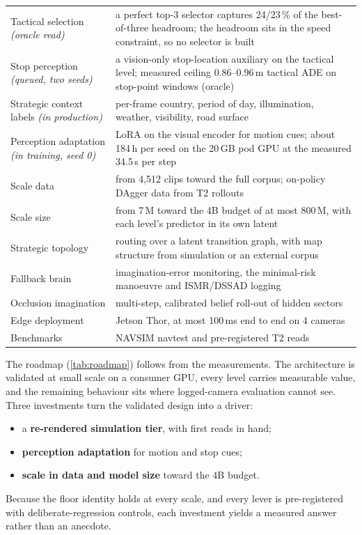 \documentclass[10pt,twocolumn]{article}
\theoremstyle{remark}
\begin{document}
\begin{table}[!t]
\begin{tabularx}{\columnwidth}{@{}>{\raggedright\arraybackslash}p{24mm}>{\raggedright\arraybackslash}X@{}}
Tactical selection \textit{(oracle read)} & a perfect top-3 selector captures 24/23\,\% of the best-of-three headroom; the headroom sits in the speed constraint, so no selector is built \\
Stop perception \textit{(queued, two seeds)} & a vision-only stop-location auxiliary on the tactical level; measured ceiling 0.86--0.96\,m tactical ADE on stop-point windows (oracle) \\
Strategic context labels \textit{(in production)} & per-frame country, period of day, illumination, weather, visibility, road surface \\
Perception adaptation \textit{(in training, seed 0)} & LoRA on the visual encoder for motion cues; about 184\,h per seed on the 20\,GB pod GPU at the measured 34.5\,s per step \\
Scale data & from 4,512 clips toward the full corpus; on-policy DAgger data from T2 rollouts \\
Scale size & from 7\,M toward the 4B budget of at most 800\,M, with each level's predictor in its own latent \\
Strategic topology & routing over a latent transition graph, with map structure from simulation or an external corpus \\
Fallback brain & imagination-error monitoring, the minimal-risk manoeuvre and ISMR/DSSAD logging \\
Occlusion imagination & multi-step, calibrated belief roll-out of hidden sectors \\
Edge deployment & Jetson Thor, at most 100\,ms end to end on 4 cameras \\
Benchmarks & NAVSIM navtest and pre-registered T2 reads \\
\bottomrule
\end{tabularx}
\end{table}

The roadmap (\cref{tab:roadmap}) follows from the measurements. The architecture is validated at small scale on a consumer GPU,
every level carries measurable value, and the remaining behaviour sits where logged-camera evaluation cannot see. Three investments
turn the validated design into a driver:
\begin{itemize}
  \item a \textbf{re-rendered simulation tier}, with first reads in hand;
  \item \textbf{perception adaptation} for motion and stop cues;
  \item \textbf{scale in data and model size} toward the 4B budget.
\end{itemize}
Because the floor identity holds at every scale, and every lever is pre-registered with deliberate-regression controls, each
investment yields a measured answer rather than an anecdote.
\end{document}
